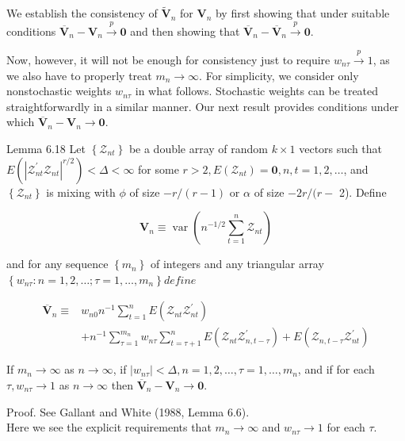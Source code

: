 \documentclass[10pt]{article}
\begin{document}
We establish the consistency of $\tilde{\mathbf{V}}_{n}$ for $\mathbf{V}_{n}$ by first showing that under suitable conditions $\overline{\mathbf{V}}_{n}-\mathbf{V}_{n} \xrightarrow{p} \mathbf{0}$ and then showing that $\overline{\mathbf{V}}_{n}-\overline{\mathbf{V}}_{n} \xrightarrow{p} \mathbf{0}$.

Now, however, it will not be enough for consistency just to require $w_{n \tau} \xrightarrow{p} 1$, as we also have to properly treat $m_{n} \rightarrow \infty$. For simplicity, we consider only nonstochastic weights $w_{n \tau}$ in what follows. Stochastic weights can be treated straightforwardly in a similar manner. Our next result provides conditions under which $\overline{\mathbf{V}}_{n}-\mathbf{V}_{n} \rightarrow \mathbf{0}$.

Lemma 6.18 Let $\left\{\mathcal{Z}_{n t}\right\}$ be a double array of random $k \times 1$ vectors such that $E\left(\left|\boldsymbol{\mathcal { Z }}_{n t}^{\prime} \boldsymbol{\mathcal { Z }}_{n t}\right|^{r / 2}\right)<\Delta<\infty$ for some $r>2, E\left(\boldsymbol{\mathcal { Z }}_{n t}\right)=\mathbf{0}, n, t= 1,2, \ldots$, and $\left\{\mathcal{Z}_{n t}\right\}$ is mixing with $\phi$ of size $-r /(r-1)$ or $\alpha$ of size $-2 r /(r-$ 2). Define

$$
\mathbf{V}_{n} \equiv \operatorname{var}\left(n^{-1 / 2} \sum_{t=1}^{n} \mathcal{Z}_{n t}\right)
$$

and for any sequence $\left\{m_{n}\right\}$ of integers and any triangular array $\left\{w_{n \tau}: n=\right. \left.1,2, \ldots ; \tau=1, \ldots, m_{n}\right\} d e f i n e$

$$
\begin{aligned}
\overline{\mathbf{V}}_{n} \equiv & w_{n 0} n^{-1} \sum_{t=1}^{n} E\left(\mathcal{Z}_{n t} \mathcal{Z}_{n t}^{\prime}\right) \\
& +n^{-1} \sum_{\tau=1}^{m_{n}} w_{n \tau} \sum_{t=\tau+1}^{n} E\left(\mathcal{Z}_{n t} \mathcal{Z}_{n, t-\tau}^{\prime}\right)+E\left(\mathcal{Z}_{n, t-\tau} \mathcal{Z}_{n t}^{\prime}\right)
\end{aligned}
$$

If $m_{n} \rightarrow \infty$ as $n \rightarrow \infty$, if $\left|w_{n \tau}\right|<\Delta, n=1,2, \ldots, \tau=1, \ldots, m_{n}$, and if for each $\tau, w_{n \tau} \rightarrow 1$ as $n \rightarrow \infty$ then $\overline{\mathbf{V}}_{n}-\mathbf{V}_{n} \rightarrow \mathbf{0}$.

Proof. See Gallant and White (1988, Lemma 6.6).\\
Here we see the explicit requirements that $m_{n} \rightarrow \infty$ and $w_{n \tau} \rightarrow 1$ for each $\tau$.
\end{document}
